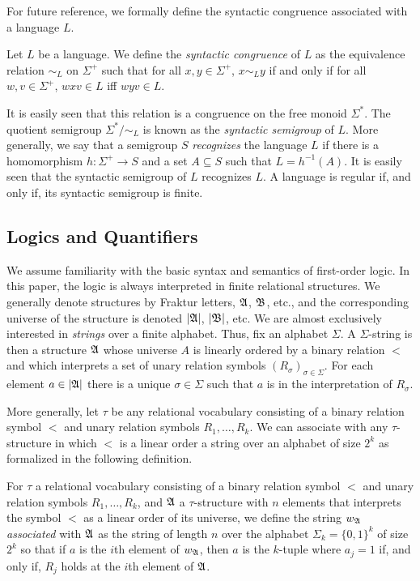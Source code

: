 \documentclass[a4paper,UKenglish,cleveref, autoref, thm-restate, anonymous]{lipics-v2021}
\begin{document}
For future reference, we formally define the syntactic congruence associated with a language $L$.
\begin{definition}\label{def:syncong}
    Let $L$ be a language. We define the \emph{syntactic congruence} of $L$ as the equivalence relation $\sim_L$ on $\Sigma^+$ such that for all $x, y \in \Sigma^+$, $x \sim_L y$ if and only if for all $w,v \in \Sigma^+$, $wxv \in L$ iff $wyv \in L$.
  \end{definition}
 It is easily seen that this relation is a congruence on the free monoid $\Sigma^*$.  The quotient semigroup $\Sigma^*/\sim_L$ is known as the \emph{syntactic semigroup} of $L$.  More generally, we say that a semigroup $S$ \emph{recognizes} the language $L$ if there is a homomorphism $h: \Sigma^+ \rightarrow S$ and a set $A \subseteq S$ such that $L = h^{-1}(A)$.  It is easily seen that the syntactic semigroup of $L$ recognizes $L$.  A language is regular if, and only if, its syntactic semigroup is finite.

\subsection{Logics and Quantifiers}\label{sec:backgroundmult}

We assume familiarity with the basic syntax and semantics of first-order logic.  In this paper, the logic is always interpreted in finite relational structures.  We generally denote structures by Fraktur letters, $\mathfrak{A}$, $\mathfrak{B}$, etc., and the corresponding universe of the structure is denoted $|\mathfrak{A}|$, $|\mathfrak{B}|$, etc.
We are almost exclusively interested in \emph{strings} over a finite alphabet.  Thus, fix an alphabet $\Sigma$.  A $\Sigma$-string is then a structure $\mathfrak{A}$ whose universe $A$ is linearly ordered by a binary relation $<$ and which interprets a set of unary relation symbols $(R_{\sigma})_{\sigma \in \Sigma}$.  For each element $a \in |\mathfrak{A}|$ there is a unique $\sigma \in \Sigma$ such that $a$ is in the interpretation of $R_{\sigma}$.

More generally, let $\tau$ be any relational vocabulary consisting of a binary relation symbol $<$ and unary relation symbols $R_1,\ldots,R_k$.  We can associate with any $\tau$-structure in which $<$ is a linear order a string over an alphabet of size $2^k$ as formalized in the following definition.
\begin{definition}\label{def:associated}
  For $\tau$ a relational vocabulary consisting of a binary relation symbol $<$ and unary relation symbols $R_1,\ldots,R_k$, and $\mathfrak{A}$ a $\tau$-structure with $n$ elements that interprets the symbol $<$ as a linear order of its universe, we define the string $w_{\mathfrak{A}}$ \emph{associated} with $\mathfrak{A}$ as the string of length $n$ over the alphabet $\Sigma_k = \{0,1\}^k$ of size $2^k$ so that if $a$ is the $i$th element  of $w_{\mathfrak{A}}$, then $a$ is the $k$-tuple where $a_j =1$ if, and only if, $R_j$ holds at the $i$th element of $\mathfrak{A}$.
\end{definition}
\end{document}
